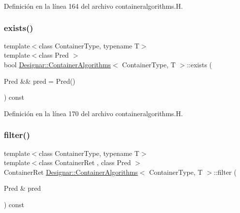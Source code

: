 Definición en la línea 164 del archivo containeralgorithms.\+H.

\mbox{\label{class_designar_1_1_container_algorithms_a12f255f04ad0c63d58957f2869caff93}} 
\subsubsection{\texorpdfstring{exists()}{exists()}\hspace{0.1cm}{\footnotesize\ttfamily [2/2]}}
{\footnotesize\ttfamily template$<$class Container\+Type, typename T$>$ \\
template$<$class Pred $>$ \\
bool \hyperlink{class_designar_1_1_container_algorithms}{Designar\+::\+Container\+Algorithms}$<$ Container\+Type, T $>$\+::exists (\begin{DoxyParamCaption}\item[{Pred \&\&}]{pred = {\ttfamily Pred()} }\end{DoxyParamCaption}) const\hspace{0.3cm}{\ttfamily [inline]}}



Definición en la línea 170 del archivo containeralgorithms.\+H.

\mbox{\label{class_designar_1_1_container_algorithms_a8fde0ef12e4287386eccf48c381b7fca}} 
\subsubsection{\texorpdfstring{filter()}{filter()}\hspace{0.1cm}{\footnotesize\ttfamily [1/2]}}
{\footnotesize\ttfamily template$<$class Container\+Type, typename T$>$ \\
template$<$class Container\+Ret , class Pred $>$ \\
Container\+Ret \hyperlink{class_designar_1_1_container_algorithms}{Designar\+::\+Container\+Algorithms}$<$ Container\+Type, T $>$\+::filter (\begin{DoxyParamCaption}\item[{Pred \&}]{pred }\end{DoxyParamCaption}) const\hspace{0.3cm}{\ttfamily [inline]}}



